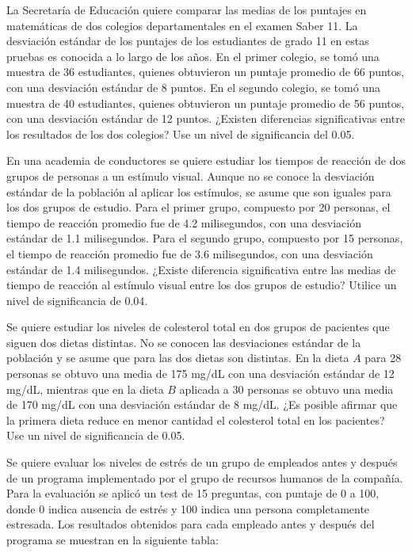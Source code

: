 \documentclass[addpoints,12pt]{exam}
\theoremstyle{plain}
\theoremstyle{remark}
\theoremstyle{definition}
\begin{document}
\begin{questions}
 \question  La Secretaría de Educación quiere comparar las medias de los puntajes en matemáticas de dos colegios departamentales en el examen Saber 11. La desviación estándar de los puntajes de los estudiantes de grado 11 en estas pruebas es conocida a lo largo de los años. En el primer colegio, se tomó una muestra de 36 estudiantes, quienes obtuvieron un puntaje promedio de 66 puntos, con una desviación estándar de 8 puntos. En el segundo colegio, se tomó una muestra de 40 estudiantes, quienes obtuvieron un puntaje promedio de 56 puntos, con una desviación estándar de 12 puntos. ¿Existen diferencias significativas entre los resultados de los dos colegios? Use un nivel de significancia del 0.05.
 
  \question  En una academia de conductores se quiere estudiar los tiempos de reacción de dos grupos de personas a un estímulo visual. Aunque no se conoce la desviación estándar de la población al aplicar los estímulos, se asume que son iguales para los dos grupos de estudio. Para el primer grupo, compuesto por 20 personas, el tiempo de reacción promedio fue de 4.2 milisegundos, con una desviación estándar de 1.1 milisegundos. Para el segundo grupo, compuesto por 15 personas, el tiempo de reacción promedio fue de 3.6 milisegundos, con una desviación estándar de 1.4 milisegundos. ¿Existe diferencia significativa entre las medias de tiempo de reacción al estímulo visual entre los dos grupos de estudio? Utilice un nivel de significancia de 0.04.
 
\question  Se quiere estudiar los niveles de colesterol total en dos grupos de pacientes que siguen dos dietas distintas. No se conocen las desviaciones estándar de la población y se asume que para las dos dietas son distintas. En la dieta $A$ para 28 personas se obtuvo una media de 175 mg/dL con una desviación estándar de 12 mg/dL, mientras que en la dieta $B$ aplicada a 30 personas se obtuvo una media de 170 mg/dL con una desviación estándar de 8 mg/dL. ¿Es posible afirmar que la primera dieta reduce en menor cantidad el colesterol total en los pacientes? Use un nivel de significancia de 0.05.
 
 \question Se quiere evaluar los niveles de estrés de un grupo de empleados antes y después de un programa implementado por el grupo de recursos humanos de la compañía. Para la evaluación se aplicó un test de 15 preguntas, con puntaje de 0 a 100, donde 0 indica ausencia de estrés y 100 indica una persona completamente estresada. Los resultados obtenidos para cada empleado antes y después del programa se muestran en la siguiente tabla:


\end{questions}
\end{document}
